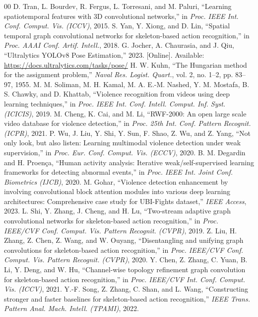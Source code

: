 \documentclass[conference]{IEEEtran}
\begin{document}
\begin{thebibliography}{00}
 D. Tran, L. Bourdev, R. Fergus, L. Torresani, and M. Paluri, ``Learning spatiotemporal features with 3D convolutional networks,'' in \textit{Proc. IEEE Int. Conf. Comput. Vis. (ICCV)}, 2015.
 S. Yan, Y. Xiong, and D. Lin, ``Spatial temporal graph convolutional networks for skeleton-based action recognition,'' in \textit{Proc. AAAI Conf. Artif. Intell.}, 2018.
 G. Jocher, A. Chaurasia, and J. Qiu, ``Ultralytics YOLOv8 Pose Estimation,'' 2023. [Online]. Available: \url{https://docs.ultralytics.com/tasks/pose/}
 H. W. Kuhn, ``The Hungarian method for the assignment problem,'' \textit{Naval Res. Logist. Quart.}, vol. 2, no. 1--2, pp. 83--97, 1955.
 M. M. Soliman, M. H. Kamal, M. A. E.-M. Nashed, Y. M. Mostafa, B. S. Chawky, and D. Khattab, ``Violence recognition from videos using deep learning techniques,'' in \textit{Proc. IEEE Int. Conf. Intell. Comput. Inf. Syst. (ICICIS)}, 2019.
 M. Cheng, K. Cai, and M. Li, ``RWF-2000: An open large scale video database for violence detection,'' in \textit{Proc. 25th Int. Conf. Pattern Recognit. (ICPR)}, 2021.
 P. Wu, J. Liu, Y. Shi, Y. Sun, F. Shao, Z. Wu, and Z. Yang, ``Not only look, but also listen: Learning multimodal violence detection under weak supervision,'' in \textit{Proc. Eur. Conf. Comput. Vis. (ECCV)}, 2020.
 B. M. Degardin and H. Proen\c{c}a, ``Human activity analysis: Iterative weak/self-supervised learning frameworks for detecting abnormal events,'' in \textit{Proc. IEEE Int. Joint Conf. Biometrics (IJCB)}, 2020.
 M. Gohar, ``Violence detection enhancement by involving convolutional block attention modules into various deep learning architectures: Comprehensive case study for UBI-Fights dataset,'' \textit{IEEE Access}, 2023.
 L. Shi, Y. Zhang, J. Cheng, and H. Lu, ``Two-stream adaptive graph convolutional networks for skeleton-based action recognition,'' in \textit{Proc. IEEE/CVF Conf. Comput. Vis. Pattern Recognit. (CVPR)}, 2019.
 Z. Liu, H. Zhang, Z. Chen, Z. Wang, and W. Ouyang, ``Disentangling and unifying graph convolutions for skeleton-based action recognition,'' in \textit{Proc. IEEE/CVF Conf. Comput. Vis. Pattern Recognit. (CVPR)}, 2020.
 Y. Chen, Z. Zhang, C. Yuan, B. Li, Y. Deng, and W. Hu, ``Channel-wise topology refinement graph convolution for skeleton-based action recognition,'' in \textit{Proc. IEEE/CVF Int. Conf. Comput. Vis. (ICCV)}, 2021.
 Y.-F. Song, Z. Zhang, C. Shan, and L. Wang, ``Constructing stronger and faster baselines for skeleton-based action recognition,'' \textit{IEEE Trans. Pattern Anal. Mach. Intell. (TPAMI)}, 2022.

\end{thebibliography}
\end{document}

